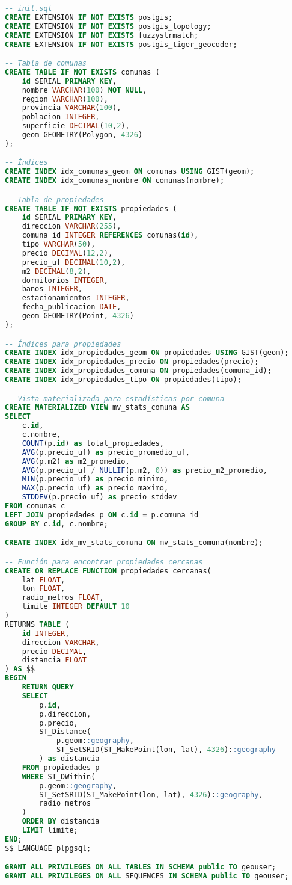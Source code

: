 \documentclass[11pt,a4paper]{article}
\begin{document}
\begin{lstlisting}[language=SQL]
-- init.sql
CREATE EXTENSION IF NOT EXISTS postgis;
CREATE EXTENSION IF NOT EXISTS postgis_topology;
CREATE EXTENSION IF NOT EXISTS fuzzystrmatch;
CREATE EXTENSION IF NOT EXISTS postgis_tiger_geocoder;

-- Tabla de comunas
CREATE TABLE IF NOT EXISTS comunas (
    id SERIAL PRIMARY KEY,
    nombre VARCHAR(100) NOT NULL,
    region VARCHAR(100),
    provincia VARCHAR(100),
    poblacion INTEGER,
    superficie DECIMAL(10,2),
    geom GEOMETRY(Polygon, 4326)
);

-- Índices
CREATE INDEX idx_comunas_geom ON comunas USING GIST(geom);
CREATE INDEX idx_comunas_nombre ON comunas(nombre);

-- Tabla de propiedades
CREATE TABLE IF NOT EXISTS propiedades (
    id SERIAL PRIMARY KEY,
    direccion VARCHAR(255),
    comuna_id INTEGER REFERENCES comunas(id),
    tipo VARCHAR(50),
    precio DECIMAL(12,2),
    precio_uf DECIMAL(10,2),
    m2 DECIMAL(8,2),
    dormitorios INTEGER,
    banos INTEGER,
    estacionamientos INTEGER,
    fecha_publicacion DATE,
    geom GEOMETRY(Point, 4326)
);

-- Índices para propiedades
CREATE INDEX idx_propiedades_geom ON propiedades USING GIST(geom);
CREATE INDEX idx_propiedades_precio ON propiedades(precio);
CREATE INDEX idx_propiedades_comuna ON propiedades(comuna_id);
CREATE INDEX idx_propiedades_tipo ON propiedades(tipo);

-- Vista materializada para estadísticas por comuna
CREATE MATERIALIZED VIEW mv_stats_comuna AS
SELECT 
    c.id,
    c.nombre,
    COUNT(p.id) as total_propiedades,
    AVG(p.precio_uf) as precio_promedio_uf,
    AVG(p.m2) as m2_promedio,
    AVG(p.precio_uf / NULLIF(p.m2, 0)) as precio_m2_promedio,
    MIN(p.precio_uf) as precio_minimo,
    MAX(p.precio_uf) as precio_maximo,
    STDDEV(p.precio_uf) as precio_stddev
FROM comunas c
LEFT JOIN propiedades p ON c.id = p.comuna_id
GROUP BY c.id, c.nombre;

CREATE INDEX idx_mv_stats_comuna ON mv_stats_comuna(nombre);

-- Función para encontrar propiedades cercanas
CREATE OR REPLACE FUNCTION propiedades_cercanas(
    lat FLOAT,
    lon FLOAT,
    radio_metros FLOAT,
    limite INTEGER DEFAULT 10
)
RETURNS TABLE (
    id INTEGER,
    direccion VARCHAR,
    precio DECIMAL,
    distancia FLOAT
) AS $$
BEGIN
    RETURN QUERY
    SELECT 
        p.id,
        p.direccion,
        p.precio,
        ST_Distance(
            p.geom::geography,
            ST_SetSRID(ST_MakePoint(lon, lat), 4326)::geography
        ) as distancia
    FROM propiedades p
    WHERE ST_DWithin(
        p.geom::geography,
        ST_SetSRID(ST_MakePoint(lon, lat), 4326)::geography,
        radio_metros
    )
    ORDER BY distancia
    LIMIT limite;
END;
$$ LANGUAGE plpgsql;

GRANT ALL PRIVILEGES ON ALL TABLES IN SCHEMA public TO geouser;
GRANT ALL PRIVILEGES ON ALL SEQUENCES IN SCHEMA public TO geouser;
\end{lstlisting}
\end{document}
